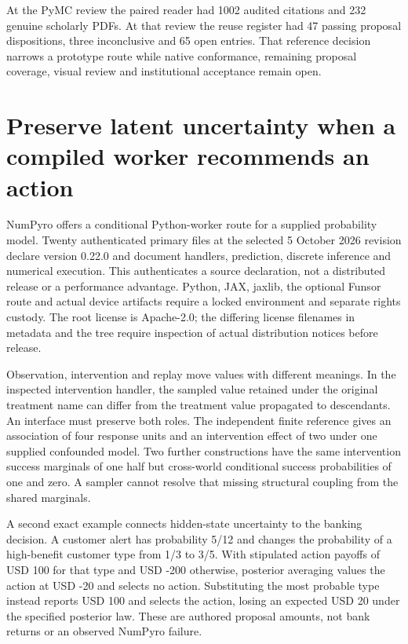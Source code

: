 At the PyMC review the paired reader had 1002 audited citations and 232
genuine scholarly PDFs. At that review the reuse register had 47 passing
proposal dispositions, three inconclusive and 65 open entries. That
reference decision narrows a prototype route while native conformance,
remaining proposal coverage, visual review and institutional acceptance
remain open. \citep{sp23pymc_reader,sp23pymc_progress}

\hypertarget{preserve-latent-uncertainty-when-a-compiled-worker-recommends-an-action}{%
\section{Preserve latent uncertainty when a compiled worker recommends
an
action}\label{preserve-latent-uncertainty-when-a-compiled-worker-recommends-an-action}}

NumPyro offers a conditional Python-worker route for a supplied
probability model. Twenty authenticated primary files at the selected 5
October 2026 revision declare version 0.22.0 and document handlers,
prediction, discrete inference and numerical execution. This
authenticates a source declaration, not a distributed release or a
performance advantage. Python, JAX, jaxlib, the optional Funsor route
and actual device artifacts require a locked environment and separate
rights custody. The root license is Apache-2.0; the differing license
filenames in metadata and the tree require inspection of actual
distribution notices before release. \citep{exec23_numpyro_sources}

Observation, intervention and replay move values with different
meanings. In the inspected intervention handler, the sampled value
retained under the original treatment name can differ from the treatment
value propagated to descendants. An interface must preserve both roles.
The independent finite reference gives an association of four response
units and an intervention effect of two under one supplied confounded
model. Two further constructions have the same intervention success
marginals of one half but cross-world conditional success probabilities
of one and zero. A sampler cannot resolve that missing structural
coupling from the shared marginals.
\citep{exec23_numpyro_sources,exec23_numpyro_reference}

A second exact example connects hidden-state uncertainty to the banking
decision. A customer alert has probability 5/12 and changes the
probability of a high-benefit customer type from 1/3 to 3/5. With
stipulated action payoffs of USD 100 for that type and USD -200
otherwise, posterior averaging values the action at USD -20 and selects
no action. Substituting the most probable type instead reports USD 100
and selects the action, losing an expected USD 20 under the specified
posterior law. These are authored proposal amounts, not bank returns or
an observed NumPyro failure. \citep{exec23_numpyro_reference}

